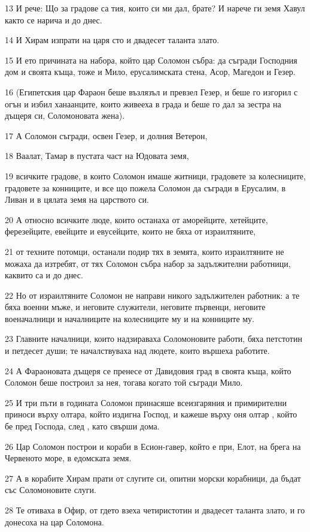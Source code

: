 \par 13 И рече: Що за градове са тия, които си ми дал, брате? И нарече ги земя Хавул както се нарича и до днес.
\par 14 И Хирам изпрати на царя сто и двадесет таланта злато.
\par 15 И ето причината на набора, който цар Соломон събра: да съгради Господния дом и своята къща, тоже и Мило, ерусалимската стена, Асор, Магедон и Гезер.
\par 16 (Египетския цар Фараон беше възлязъл и превзел Гезер, и беше го изгорил с огън и избил ханаанците, които живееха в града и беше го дал за зестра на дъщеря си, Соломоновата жена).
\par 17 А Соломон съгради, освен Гезер, и долния Ветерон,
\par 18 Ваалат, Тамар в пустата част на Юдовата земя,
\par 19 всичките градове, в които Соломон имаше житници, градовете за колесниците, градовете за конниците, и все що пожела Соломон да съгради в Ерусалим, в Ливан и в цялата земя на царството си.
\par 20 А относно всичките люде, които останаха от аморейците, хетейците, ферезейците, евейците и евусейците, които не бяха от израилтяните,
\par 21 от техните потомци, останали подир тях в земята, които израилтяните не можаха да изтребят, от тях Соломон събра набор за задължителни работници, каквито са и до днес.
\par 22 Но от израилтяните Соломон не направи никого задължителен работник: а те бяха военни мъже, и неговите служители, неговите първенци, неговите военачалници и началниците на колесниците му и на конниците му.
\par 23 Главните началници, които надзираваха Соломоновите работи, бяха петстотин и петдесет души; те началствуваха над людете, които вършеха работите.
\par 24 А Фараоновата дъщеря се пренесе от Давидовия град в своята къща, който Соломон беше построил за нея, тогава когато той съгради Мило.
\par 25 И три пъти в годината Соломон принасяше всеизгаряния и примирителни приноси върху олтара, който издигна Господ, и кажеше върху оня олтар , който бе пред Господа, след , като свърши дома.
\par 26 Цар Соломон построи и кораби в Есион-гавер, който е при, Елот, на брега на Червеното море, в едомската земя.
\par 27 А в корабите Хирам прати от слугите си, опитни морски корабници, да бъдат със Соломоновите слуги.
\par 28 Те отиваха в Офир, от гдето взеха четиристотин и двадесет таланта злато, и го донесоха на цар Соломона.

